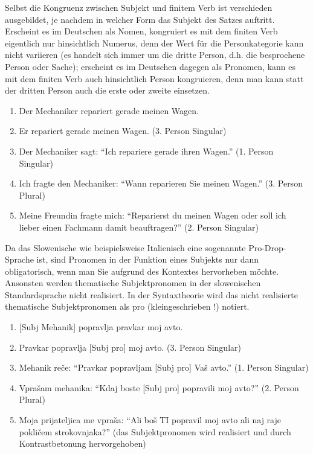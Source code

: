 \documentclass[
]{article}
\providecommand{\tightlist}{%
  \setlength{\itemsep}{0pt}\setlength{\parskip}{0pt}}
\begin{document}
Selbst die Kongruenz zwischen Subjekt und finitem Verb ist verschieden ausgebildet, je nachdem in welcher Form das Subjekt des Satzes auftritt. Erscheint es im Deutschen als Nomen, kongruiert es mit dem finiten Verb eigentlich nur hinsichtlich Numerus, denn der Wert für die Personkategorie kann nicht variieren (es handelt sich immer um die dritte Person, d.h. die besprochene Person oder Sache); erscheint es im Deutschen dagegen als Pronomen, kann es mit dem finiten Verb auch hinsichtlich Person kongruieren, denn man kann statt der dritten Person auch die erste oder zweite einsetzen.

\begin{enumerate}
\def\labelenumi{(\arabic{enumi})}
\setcounter{enumi}{7}
\tightlist
\item
  Der Mechaniker repariert gerade meinen Wagen.
\item
  Er repariert gerade meinen Wagen. (3. Person Singular)
\item
  Der Mechaniker sagt: ``Ich repariere gerade ihren Wagen.'' (1. Person Singular)
\item
  Ich fragte den Mechaniker: ``Wann reparieren Sie meinen Wagen.'' (3. Person Plural)
\item
  Meine Freundin fragte mich: ``Reparierst du meinen Wagen oder soll ich lieber einen Fachmann damit beauftragen?'' (2. Person Singular)
\end{enumerate}

Da das Slowenische wie beispielsweise Italienisch eine sogenannte Pro-Drop-Sprache ist, sind Pronomen in der Funktion eines Subjekts nur dann obligatorisch, wenn man Sie aufgrund des Kontextes hervorheben möchte. Ansonsten werden thematische Subjektpronomen in der slowenischen Standardsprache nicht realisiert. In der Syntaxtheorie wird das nicht realisierte thematische Subjektpronomen als pro (kleingeschrieben !) notiert.

\begin{enumerate}
\def\labelenumi{(\arabic{enumi})}
\setcounter{enumi}{12}
\tightlist
\item
  {[}Subj Mehanik{]} popravlja pravkar moj avto.
\item
  Pravkar popravlja {[}Subj pro{]} moj avto. (3. Person Singular)
\item
  Mehanik reče: ``Pravkar popravljam {[}Subj pro{]} Vaš avto.'' (1. Person Singular)
\item
  Vprašam mehanika: ``Kdaj boste {[}Subj pro{]} popravili moj avto?'' (2. Person Plural)
\item
  Moja prijateljica me vpraša: ``Ali boš TI popravil moj avto ali naj raje pokličem strokovnjaka?'' (das Subjektpronomen wird realisiert und durch Kontrastbetonung hervorgehoben)
\end{enumerate}
\end{document}
